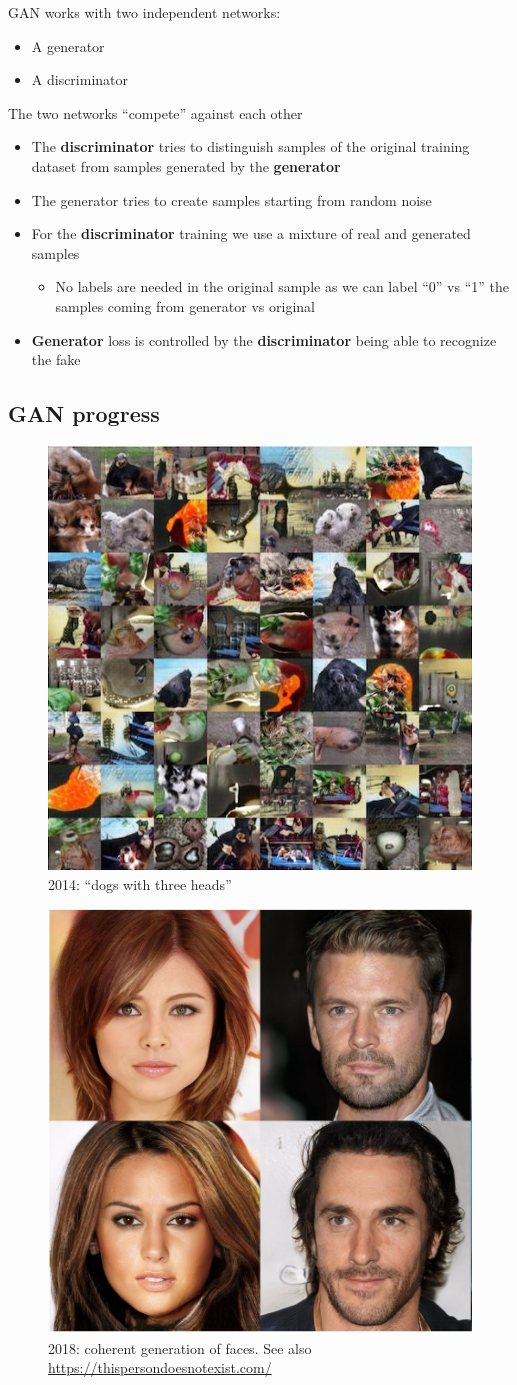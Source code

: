 GAN works with two independent networks:

\begin{itemize}
	\item A generator
	\item A discriminator
\end{itemize}

The two networks “compete” against each other

\begin{itemize}
	\item The \textbf{discriminator} tries to distinguish samples of the original training dataset from samples generated by the \textbf{generator}
	\item The generator tries to create samples starting from random noise
	\item For the \textbf{discriminator} training we use a mixture of real and generated samples
	\begin{itemize}
		\item No labels are needed in the original	sample as we can label “0” vs “1” the
		samples coming from generator vs original
	\end{itemize}
	\item \textbf{Generator} loss is controlled by the \textbf{discriminator} being able to recognize the fake
\end{itemize}

\subsection{GAN progress}


\begin{figure}[ht]
	\centering
	\includegraphics[width=0.33\linewidth]{figure_ml/dogs.png}
	\caption{2014: “dogs with three heads”}
\end{figure}
\FloatBarrier

\begin{figure}[ht]
	\centering
	\includegraphics[width=0.33\linewidth]{figure_ml/faces.png}
	\caption{2018: coherent generation of faces. See also \url{https://thispersondoesnotexist.com/}}
\end{figure}


